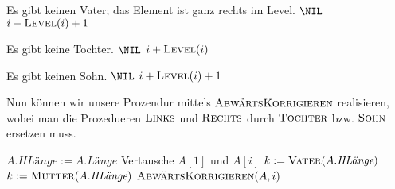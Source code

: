 \begin{solution}
\begin{enumerate}[label = \alph*]
  \phantom{}

  \begin{algorithmic}
        \Comment Es gibt keinen Vater; das Element ist ganz rechts im Level.
        \State \Return $\NIL$
      \Else
        \State \Return $i - \textsc{Level}(i) + 1$
      \EndIf
    \EndProcedure
  \end{algorithmic}

  \phantom{}

  \begin{algorithmic}
        \Comment Es gibt keine Tochter.
        \State \Return $\NIL$
      \Else
        \State \Return $i + \textsc{Level}(i)$
        \EndIf
      \EndProcedure
  \end{algorithmic}

  \phantom{}

  \begin{algorithmic}
        \Comment Es gibt keinen Sohn.
        \State \Return $\NIL$
      \Else
        \State \Return $i + \textsc{Level}(i) + 1$
      \EndIf
    \EndProcedure
  \end{algorithmic}

  \phantom{}


  Nun können wir unsere Prozendur mittels $\textsc{AbwärtsKorrigieren}$ realisieren, wobei man die Prozedueren $\textsc{Links}$ und $\textsc{Rechts}$ durch $\textsc{Tochter}$ bzw. $\textsc{Sohn}$ ersetzen muss.

  \phantom{}

  \begin{algorithmic}
      \State $A.\textit{HLänge} := A.\textit{Länge}$
      \State Vertausche $A[1]$ und $A[i]$
      \State $k := \textsc{Vater}(A.\textit{HLänge})$
        \State $k := \textsc{Mutter}(A.\textit{HLänge})$
      \EndIf
          \State $\textsc{AbwärtsKorrigieren}(A, i)$
        \EndFor
      \EndIf
    \EndProcedure
  \end{algorithmic}

\end{enumerate}

\end{solution}
